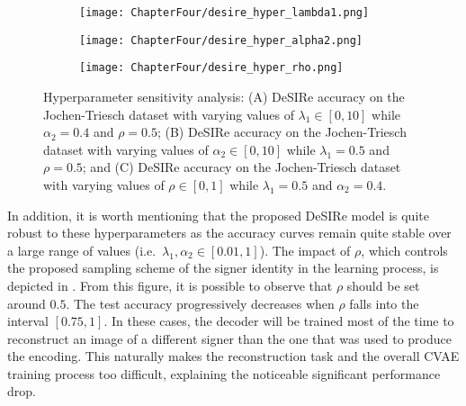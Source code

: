 \begin{figure*}
    \centering
    \begin{subfigure}{0.325\textwidth}
        \centering
        \texttt{[image: ChapterFour/desire\_hyper\_lambda1.png]}
        \caption{}
        \label{fig:desire_hyper_lambda1}
    \end{subfigure}
    \hfill
    \begin{subfigure}{0.325\textwidth}
        \centering
        \texttt{[image: ChapterFour/desire\_hyper\_alpha2.png]}
        \caption{}
        \label{fig:desire_hyper_alpha2}
    \end{subfigure}
    \hfill
    \begin{subfigure}{0.325\textwidth}
        \centering
        \texttt{[image: ChapterFour/desire\_hyper\_rho.png]}
        \caption{}
        \label{fig:desire_hyper_rho}
    \end{subfigure}
    \caption{Hyperparameter sensitivity analysis: (A) DeSIRe accuracy on the Jochen-Triesch dataset with varying values of $\lambda_{1}\in[0,10]$ while $\alpha_{2}=0.4$ and $\rho=0.5$; (B) DeSIRe accuracy on the Jochen-Triesch dataset with varying values of $\alpha_{2}\in[0,10]$ while $\lambda_{1}=0.5$ and $\rho=0.5$; and (C) DeSIRe accuracy on the Jochen-Triesch dataset with varying values of $\rho\in[0,1]$ while $\lambda_{1}=0.5$ and $\alpha_{2}=0.4$.}
    \label{fig:desire_hyperparams}
\end{figure*}

In addition, it is worth mentioning that the proposed DeSIRe model is quite robust to these hyperparameters as the accuracy curves remain quite stable over a large range of values (i.e.\ $\lambda_{1},\alpha_{2}\in [0.01, 1]$). The impact of $\rho$, which controls the proposed sampling scheme of the signer identity in the learning process, is depicted in . From this figure, it is possible to observe that $\rho$ should be set around $0.5$. The test accuracy progressively decreases when $\rho$ falls into the interval $[0.75, 1]$. In these cases, the decoder will be trained most of the time to reconstruct an image of a different signer than the one that was used to produce the encoding. This naturally makes the reconstruction task and the overall CVAE training process too difficult, explaining the noticeable significant performance drop.
